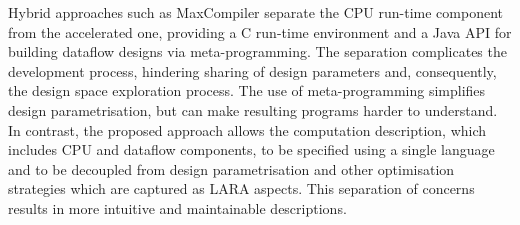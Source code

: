 Hybrid approaches such as MaxCompiler\cite{5719584} separate the CPU
run-time component from the accelerated one, providing a C run-time
environment and a Java API for building dataflow designs via
meta-programming. The separation complicates the development process,
hindering sharing of design parameters and, consequently, the design
space exploration process. The use of meta-programming simplifies
design parametrisation, but can make resulting programs harder to
understand. In contrast, the proposed approach allows the computation
description, which includes CPU and dataflow components, to be specified
using a single language and to be decoupled from design
parametrisation and other optimisation strategies which are captured
as LARA aspects. This separation of concerns results in more intuitive
and maintainable descriptions.


